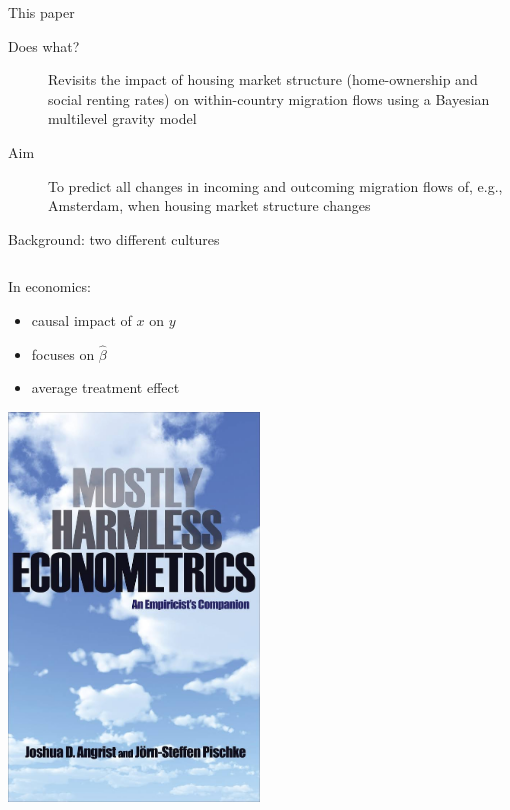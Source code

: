 \documentclass{beamer}
\begin{document}
\begin{frame}{This paper}
\begin{description}
	
	\item[Does what?] \alert{Revisits} the impact of housing market structure (home-ownership and social renting rates) on within-country migration flows using a Bayesian multilevel gravity model \citep{congdon2010random}
	\newline
	\item[Aim] To \alert{predict} all changes in incoming and outcoming migration flows of, e.g., Amsterdam, when housing market structure changes
\end{description}
\end{frame}

\begin{frame}{Background: two different cultures \citep{breiman2001statistical}}
\begin{columns}
	\begin{column}{0.5\textwidth}
		In economics: 
		\begin{itemize}
			\item \alert{causal} impact of $x$ on $y$
			\item \alert{focuses} on $\hat{\beta}$
			\item \alert{average} treatment effect
		\end{itemize}
		\begin{center}
			\includegraphics[width=0.5\textwidth]{../fig/harmless}      
		\end{center}
	\end{column}\pause

\end{columns}
\end{frame}
\end{document}
